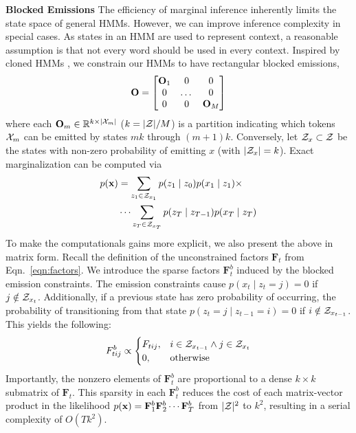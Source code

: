 \documentclass[11pt,a4paper]{article}
\begin{document}
\noindent
\textbf{Blocked Emissions} The efficiency of marginal inference inherently limits 
the state space of general HMMs.
However, we can improve inference complexity in special cases.
As states in an HMM are used to represent context, a reasonable assumption
is that not every word should be used in every context.
Inspired by cloned HMMs \citep{dedieu2019learning},
we constrain our HMMs to have rectangular blocked emissions,
\[\mathbf{O} = \begin{bmatrix} \mathbf{O}_1 & 0 & 0 \\ 0 & $\dots$ & 0 \\ 0 & 0 & \mathbf{O}_M \\
\end{bmatrix}\]
where each $\mathbf{O}_m \in \mathbb{R}^{ k \times |\mathcal{X}_m|}$ ($k = |{\mathcal{Z}}|/M$)
is a partition indicating which tokens $\mathcal{X}_m$ can be emitted by states
$mk$ through $(m+1)k$.
Conversely, let $\mathcal{Z}_x \subset {\cal Z}$ be the states with non-zero probability of emitting $x$
(with $|\mathcal{Z}_x| = k$).
Exact marginalization can be computed via 
\begin{equation}
\label{eqn:sparse_marginalization}
\begin{aligned}
p(\mathbf{x}) &= \sum_{z_1 \in \mathcal{Z}_{x_1}} p(z_1\mid z_0)p(x_1 \mid z_1) \times\\
    &\cdots
    \sum_{z_T \in \mathcal{Z}_{x_T}} p(z_T \mid z_{T-1})p(x_T \mid z_T)
\end{aligned}
\end{equation}
To make the computationals gains more explicit, we also present the above in matrix form.
Recall the definition of the unconstrained factors
$\mathbf{F}_t$ from Eqn.~\ref{eqn:factors}.
We introduce the sparse factors $\mathbf{F}_t^b$ induced by the blocked emission constraints.
The emission constraints cause $p(x_t \mid z_t=j) = 0$ if $j\notin\mathcal{Z}_{x_t}$.
Additionally, if a previous state has zero probability of occurring, the probability
of transitioning from that state $p(z_t = j \mid z_{t-1} = i) = 0$ if $i\notin\mathcal{Z}_{x_{t-1}}$.
This yields the following:
\begin{equation}
\label{eqn:sparse_factors}
F_{tij}^b \propto \begin{cases}
F_{tij}, & i\in\mathcal{Z}_{x_{t-1}} \wedge j\in\mathcal{Z}_{x_t}\\
0, & \textrm{otherwise}
\end{cases}
\end{equation}
Importantly, the nonzero elements of $\mathbf{F}_t^b$ are proportional to
a dense $k \times k$ submatrix of $\mathbf{F}_t$.
This sparsity in each $\mathbf{F}_t^b$
reduces the cost of each matrix-vector product in the likelihood
$p(\mathbf{x}) = \mathbf{F}_1^b\mathbf{F}_2^b\cdots\mathbf{F}_T^b$
from $|\mathcal{Z}|^2$ to $k^2$,
resulting in a serial complexity of $O(Tk^2)$.
\end{document}
